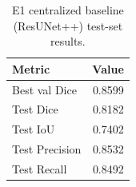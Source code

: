 \begin{table}[t]
\centering
\begin{tabular}{lr}
\toprule
Metric & Value \\
\midrule
Best val Dice & 0.8599 \\
Test Dice & 0.8182 \\
Test IoU & 0.7402 \\
Test Precision & 0.8532 \\
Test Recall & 0.8492 \\
\bottomrule
\end{tabular}
\caption{E1 centralized baseline (ResUNet++) test-set results.}
\label{tab:e1-baseline}
\end{table}
